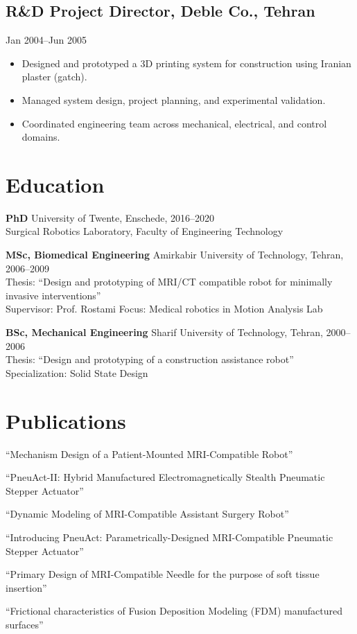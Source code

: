 \documentclass[11pt,a4paper]{article}
\begin{document}
\subsection{R\&D Project Director, Deble Co., Tehran}
\hfill {\small Jan 2004--Jun 2005}
\begin{itemize}
 \item Designed and prototyped a 3D printing system for construction using Iranian plaster (gatch).
 \item Managed system design, project planning, and experimental validation.
 \item Coordinated engineering team across mechanical, electrical, and control domains.
\end{itemize}

\section{Education}

\textbf{PhD} \hfill University of Twente, Enschede, 2016--2020 \\
{\small Surgical Robotics Laboratory, Faculty of Engineering Technology }

\vspace{4pt}
\textbf{MSc, Biomedical Engineering} \hfill Amirkabir University of Technology, Tehran, 2006--2009 \\
{\small Thesis: ``Design and prototyping of MRI/CT compatible robot for minimally invasive interventions'' \\
Supervisor: Prof. Rostami \quad Focus: Medical robotics in Motion Analysis Lab}

\vspace{4pt}
\textbf{BSc, Mechanical Engineering} \hfill Sharif University of Technology, Tehran, 2000--2006 \\
{\small Thesis: ``Design and prototyping of a construction assistance robot'' \quad Specialization: Solid State Design}

\section{Publications}

\begin{enumerate}[label={[\arabic*]}]
 \item ``Mechanism Design of a Patient-Mounted MRI-Compatible Robot''
 \item ``PneuAct-II: Hybrid Manufactured Electromagnetically Stealth Pneumatic Stepper Actuator''
 \item ``Dynamic Modeling of MRI-Compatible Assistant Surgery Robot''
 \item ``Introducing PneuAct: Parametrically-Designed MRI-Compatible Pneumatic Stepper Actuator''
 \item ``Primary Design of MRI-Compatible Needle for the purpose of soft tissue insertion''
 \item ``Frictional characteristics of Fusion Deposition Modeling (FDM) manufactured surfaces''
\end{enumerate}
\end{document}
